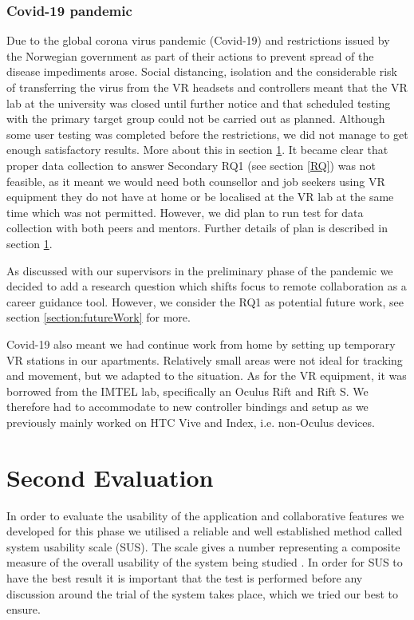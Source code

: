\subsubsection{Covid-19 pandemic}
\label{section:covid19}
Due to the global corona virus pandemic (Covid-19) and restrictions issued by the Norwegian government as part of their actions to prevent spread of the disease \cite{FhiCorona} impediments arose. Social distancing, isolation and the considerable risk of transferring the virus from the VR headsets and controllers meant that the VR lab at the university was closed until further notice and that scheduled testing with the primary target group could not be carried out as planned. Although some user testing was completed before the restrictions, we did not manage to get enough satisfactory results. More about this in section \ref{section:secondEvalPhase2}. It became clear that proper data collection to answer Secondary RQ1 (see section \ref{RQ}) was not feasible, as it meant we would need both counsellor and job seekers using VR equipment they do not have at home or be localised at the VR lab at the same time which was not permitted. However, we did plan to run test for data collection with both peers and mentors. Further details of plan is described in section \ref{section:secondEvalPhase2}.

As discussed with our supervisors in the preliminary phase of the pandemic we decided to add a research question which shifts focus to remote collaboration as a career guidance tool. However, we consider the RQ1 as potential future work, see section \ref{section:futureWork} for more. 

Covid-19 also meant we had continue work from home by setting up temporary VR stations in our apartments. Relatively small areas were not ideal for tracking and movement, but we adapted to the situation. As for the VR equipment, it was borrowed from the IMTEL lab, specifically an Oculus Rift and Rift S. We therefore had to accommodate to new controller bindings and setup as we previously mainly worked on HTC Vive and Index, i.e. non-Oculus devices.            





\section{Second Evaluation}
\label{section:secondEvalPhase2}
In order to evaluate the usability of the application and collaborative features we developed for this phase we utilised a reliable and well established method called system usability scale (SUS). The scale gives a number representing a composite measure of the overall usability of the system being studied \cite{brooke1996sus}. In order for SUS to have the best result it is important that the test is performed before any discussion around the trial of the system takes place, which we tried our best to ensure.

